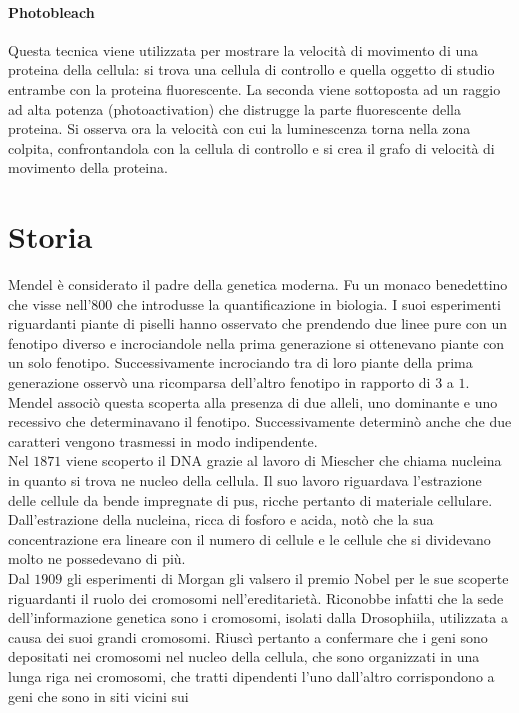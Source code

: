 \paragraph{Photobleach}
Questa tecnica viene utilizzata per mostrare la velocit\`a di movimento di una proteina della cellula: si trova una cellula di controllo e quella oggetto di 
studio entrambe con la proteina fluorescente. La seconda viene sottoposta ad un raggio ad alta potenza (photoactivation) che distrugge la parte fluorescente
della proteina. Si osserva ora la velocit\`a con cui la luminescenza torna nella zona colpita, confrontandola con la cellula di controllo e si crea il grafo
di velocit\`a di movimento della proteina.
\section{Storia}
Mendel \`e considerato il padre della genetica moderna. Fu un monaco benedettino che visse nell'800 che introdusse la quantificazione in biologia. I suoi esperimenti riguardanti piante 
di piselli hanno osservato che prendendo due linee pure con un fenotipo diverso e incrociandole nella prima generazione si ottenevano piante con un solo fenotipo. Successivamente 
incrociando tra di loro piante della prima generazione osserv\`o una ricomparsa dell'altro fenotipo in rapporto di $3$ a $1$. Mendel associ\`o questa scoperta alla presenza di due 
alleli, uno dominante e uno recessivo che determinavano il fenotipo. Successivamente determin\`o anche che due caratteri vengono trasmessi in modo indipendente. \\
Nel $1871$ viene scoperto il DNA grazie al lavoro di Miescher che chiama nucleina in quanto si trova ne nucleo della cellula. Il suo lavoro riguardava l'estrazione delle cellule da
bende impregnate di pus, ricche pertanto di materiale cellulare. Dall'estrazione della nucleina, ricca di fosforo e acida,  not\`o che la sua concentrazione era lineare con il numero di 
cellule e le cellule che si dividevano molto ne possedevano di pi\`u.\\
Dal $1909$ gli esperimenti di Morgan gli valsero il premio Nobel per le sue scoperte riguardanti il ruolo dei cromosomi nell'ereditariet\`a. Riconobbe infatti che la sede 
dell'informazione genetica sono i cromosomi, isolati dalla Drosophiila, utilizzata a causa dei suoi grandi cromosomi. Riusc\`i pertanto a confermare che i geni sono depositati nei 
cromosomi nel nucleo della cellula, che sono organizzati in una lunga riga nei cromosomi, che tratti dipendenti l'uno dall'altro corrispondono a geni che sono in siti vicini sui 
